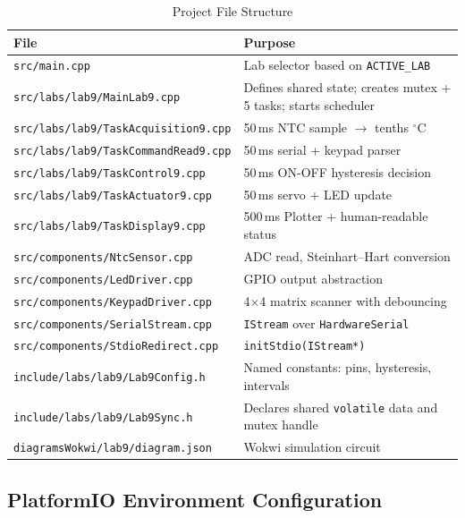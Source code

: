 \documentclass[12pt]{article}
\begin{document}
\begin{table}[H]
\centering
\begin{tabular}{@{}lp{8.0cm}@{}}
\toprule
\textbf{File} & \textbf{Purpose} \\
\midrule
\texttt{src/main.cpp}                       & Lab selector based on \texttt{ACTIVE\_LAB} \\
\texttt{src/labs/lab9/MainLab9.cpp}         & Defines shared state; creates mutex + 5 tasks; starts scheduler \\
\texttt{src/labs/lab9/TaskAcquisition9.cpp} & 50\,ms NTC sample $\to$ tenths $^{\circ}$C \\
\texttt{src/labs/lab9/TaskCommandRead9.cpp} & 50\,ms serial + keypad parser \\
\texttt{src/labs/lab9/TaskControl9.cpp}     & 50\,ms ON-OFF hysteresis decision \\
\texttt{src/labs/lab9/TaskActuator9.cpp}    & 50\,ms servo + LED update \\
\texttt{src/labs/lab9/TaskDisplay9.cpp}     & 500\,ms Plotter + human-readable status \\
\texttt{src/components/NtcSensor.cpp}       & ADC read, Steinhart--Hart conversion \\
\texttt{src/components/LedDriver.cpp}       & GPIO output abstraction \\
\texttt{src/components/KeypadDriver.cpp}    & 4$\times$4 matrix scanner with debouncing \\
\texttt{src/components/SerialStream.cpp}    & \texttt{IStream} over \texttt{HardwareSerial} \\
\texttt{src/components/StdioRedirect.cpp}   & \texttt{initStdio(IStream*)} \\
\texttt{include/labs/lab9/Lab9Config.h}     & Named constants: pins, hysteresis, intervals \\
\texttt{include/labs/lab9/Lab9Sync.h}       & Declares shared \texttt{volatile} data and mutex handle \\
\texttt{diagramsWokwi/lab9/diagram.json}    & Wokwi simulation circuit \\
\bottomrule
\end{tabular}
\caption{Project File Structure}
\label{tab:files}
\end{table}

\subsection{PlatformIO Environment Configuration}
\end{document}
